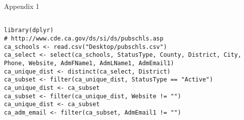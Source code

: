 \begin{center}
Appendix 1
\end{center}

\begin{lstlisting}

library(dplyr)
# http://www.cde.ca.gov/ds/si/ds/pubschls.asp
ca_schools <- read.csv("Desktop/pubschls.csv")
ca_select <- select(ca_schools, StatusType, County, District, City, Phone, Website, AdmFName1, AdmLName1, AdmEmail1)
ca_unique_dist <- distinct(ca_select, District)
ca_subset <- filter(ca_unique_dist, StatusType == "Active")
ca_unique_dist <- ca_subset
ca_subset <- filter(ca_unique_dist, Website != "")
ca_unique_dist <- ca_subset
ca_adm_email <- filter(ca_subset, AdmEmail1 != "")

\end{lstlisting}